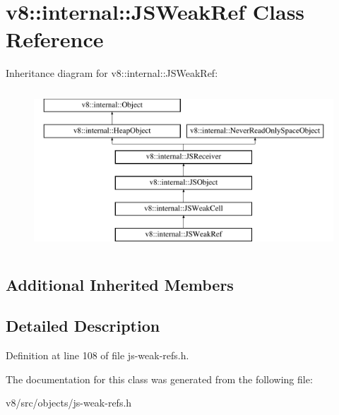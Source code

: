 \hypertarget{classv8_1_1internal_1_1JSWeakRef}{}\section{v8\+:\+:internal\+:\+:J\+S\+Weak\+Ref Class Reference}
\label{classv8_1_1internal_1_1JSWeakRef}
Inheritance diagram for v8\+:\+:internal\+:\+:J\+S\+Weak\+Ref\+:\begin{figure}[H]
\begin{center}
\leavevmode
\includegraphics[height=6.000000cm]{classv8_1_1internal_1_1JSWeakRef}
\end{center}
\end{figure}
\subsection*{Additional Inherited Members}


\subsection{Detailed Description}


Definition at line 108 of file js-\/weak-\/refs.\+h.



The documentation for this class was generated from the following file\+:\begin{DoxyCompactItemize}
\item 
v8/src/objects/js-\/weak-\/refs.\+h\end{DoxyCompactItemize}
